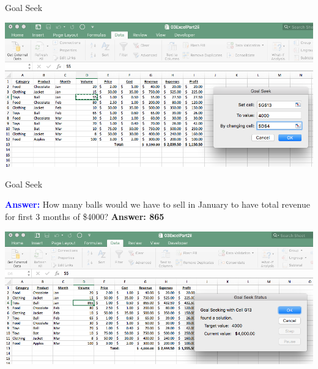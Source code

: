 \documentclass[xcolor=svgnames]{beamer}
\newcommand{\blue}[1]{{\textcolor{blue}{#1}}}
\begin{document}
\begin{frame}{Goal Seek}
\begin{center}
\includegraphics[width=.99\textwidth]{GoalSeek1}
\end{center}
\end{frame}

\begin{frame}{Goal Seek}
\begin{block}
{}\blue{\bf Answer:} How many balls would we have to sell in January to have total revenue for first 3 months of \$4000?  
{\bf Answer: 865}	
\end{block}
\begin{center}
\includegraphics[width=.99\textwidth]{GoalSeek2}
\end{center}
\end{frame}
\end{document}
